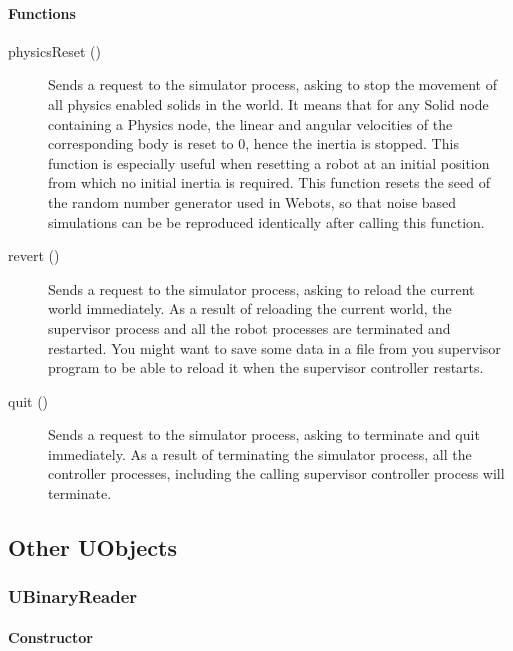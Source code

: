 \paragraph{Functions}
\label{webots.uobjects.supervisor.simulationcontroller.functions}%

\noindent
\begin{description}
\item[{physicsReset ()}] Sends a request to the simulator process,
  asking to stop the movement of all physics enabled solids in the
  world. It means that for any Solid node containing a Physics node,
  the linear and angular velocities of the corresponding body is reset
  to 0, hence the inertia is stopped. This function is especially
  useful when resetting a robot at an initial position from which no
  initial inertia is required.  This function resets the seed of the
  random number generator used in Webots, so that noise based
  simulations can be be reproduced identically after calling this
  function.

\item[{revert ()}] Sends a request to the simulator process, asking to
  reload the current world immediately. As a result of reloading the
  current world, the supervisor process and all the robot processes
  are terminated and restarted. You might want to save some data in a
  file from you supervisor program to be able to reload it when the
  supervisor controller restarts.

\item[{quit ()}] Sends a request to the simulator process, asking to
  terminate and quit immediately. As a result of terminating the
  simulator process, all the controller processes, including the
  calling supervisor controller process will terminate.

\end{description}

\subsection{Other UObjects}
\label{webots.uobjects.other}%

\subsubsection{UBinaryReader}
\label{webots.uobjects.other.ubinaryreader}%

\paragraph{Constructor}
\label{webots.uobjects.other.ubinaryreader.constructor}%


